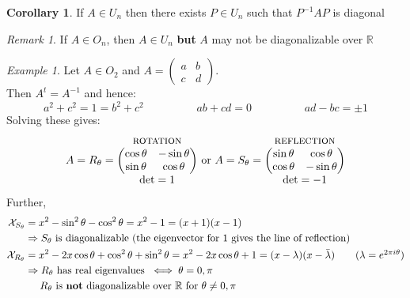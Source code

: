 \documentclass[11pt, a4paper]{report}
\numberwithin{equation}{section}
\renewcommand{\chi}{\mathcal{X}}
\newcommand{\R}{\mathbb{R}}
\newcommand{\smp}[1]{\left(\begin{smallmatrix}#1\end{smallmatrix}\right)}
\newcommand{\mx}[1]{\begin{matrix}#1\end{matrix}}
\newcommand{\pmx}[1]{\begin{pmatrix}#1\end{pmatrix}}
\numberwithin{equation}{subsection}
\theoremstyle{plain}
\theoremstyle{definition}
\newtheorem{cor}[thm]{Corollary}
\theoremstyle{remark}
\newtheorem*{rem}{Remark}
\newtheorem{exmp}{Example}[chapter]
\begin{document}
\begin{cor}
If $A \in U_n$ then there exists $P \in U_n$ such that $P^{-1}AP$ is diagonal
\end{cor}

\begin{rem}
If $A \in O_n$, then $A \in U_n$ \textbf{but} $A$ may not be diagonalizable over $\R$
\end{rem}

\begin{exmp}
Let $A \in O_2$ and $A = \smp{a & b \\ c & d}$.\\ Then $A^t = A^{-1}$ and hence:
$$a^2 + c^2 = 1 = b^2 + c^2 \hspace{2cm} ab + cd = 0 \hspace{2cm} ad - bc = \pm 1$$
Solving these gives:
$$A = R_\theta = \mx{\text{\sc rotation} \\ \pmx{\cos \theta & -\sin \theta \\ \sin \theta & \cos \theta} \\ \det = 1} \text{ or } A = S_\theta = \mx{\text{\sc reflection} \\ \pmx{\sin \theta & \cos \theta \\ \cos \theta & -\sin \theta} \\ \det = -1}$$
Further,
\begin{align*}
\chi_{S_\theta} &= x^2 - \sin^2 \theta - \cos^2 \theta = x^2 - 1 = (x+1)(x-1)\\
&\Rightarrow S_\theta \text{ is diagonalizable (the eigenvector for 1 gives the line of reflection)}\\
\chi_{R_\theta} &= x^2 - 2x \cos \theta + \cos^2 \theta + \sin^2 \theta = x^2 - 2x \cos \theta + 1 = (x - \lambda)(x - \bar{\lambda}) \tag{$\lambda = e^{2\pi i \theta}$}\\
&\Rightarrow R_\theta \text{ has real eigenvalues } \iff \theta = 0, \pi\\
&\phantom{\Rightarrow\;\,} R_\theta \text{ is \textbf{not} diagonalizable over $\R$ for } \theta \neq 0, \pi
\end{align*}
\end{exmp}

\newpage
\end{document}
